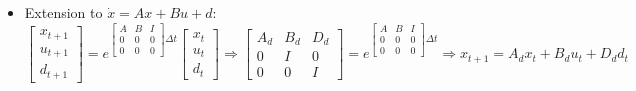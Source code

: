 \begin{itemize}
\begin{equation}
{\begin{bmatrix}
        \end{bmatrix} \Delta t}\begin{bmatrix}
        x_{t}\\
        u_{t}
        \end{bmatrix} \Rightarrow \begin{bmatrix}
        A_{d} & B_{d}\\
        0 & I
        \end{bmatrix} =e^{\begin{bmatrix}
        A & B\\
        0 & 0
        \end{bmatrix} \Delta t} \Rightarrow x_{t+1} =A_{d} x_{t} +B_{d} u_{t}
    \end{equation}
    \item Extension to $\dot x = Ax + Bu + d$:  
    \begin{equation}
        \begin{bmatrix}
        x_{t+1}\\
        u_{t+1}\\
        d_{t+1}
        \end{bmatrix} =e^{\begin{bmatrix}
        A & B & I\\
        0 & 0 & 0\\
        0 & 0 & 0
        \end{bmatrix} \Delta t}\begin{bmatrix}
        x_{t}\\
        u_{t}\\
        d_{t}
        \end{bmatrix} \Rightarrow \begin{bmatrix}
        A_{d} & B_{d} & D_{d}\\
        0 & I & 0\\
        0 & 0 & I
        \end{bmatrix} =e^{\begin{bmatrix}
        A & B & I\\
        0 & 0 & 0\\
        0 & 0 & 0
        \end{bmatrix} \Delta t} \Rightarrow x_{t+1} =A_{d} x_{t} +B_{d} u_{t} +D_{d} d_{t}
    \end{equation}

\end{itemize}
